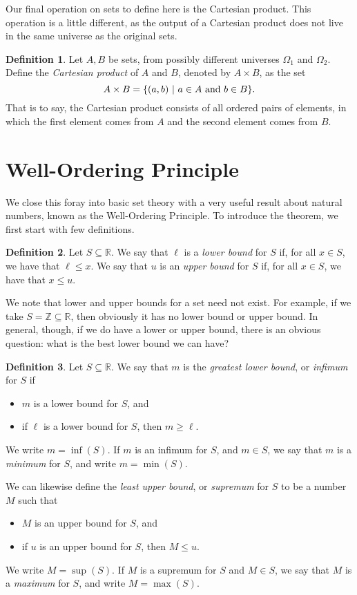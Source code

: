 \documentclass{article}
\theoremstyle{definition}
\newtheorem{definition}{Definition}
\newcommand{\Z}{\mathbb{Z}}
\newcommand{\R}{\mathbb{R}}
\begin{document}
Our final operation on sets to define here is the Cartesian product. This operation is a little different, as the output of a Cartesian product does not live in the same universe as the original sets. 

\begin{definition}
Let $A, B$ be sets, from possibly different universes $\Omega_1$ and $\Omega_2$. Define the {\it Cartesian product} of $A$ and $B$, denoted by $A\times B$, as the set \[A\times B = \{(a, b)\ | \ a\in A\hbox{ and }b\in B\}.\] That is to say, the Cartesian product consists of all ordered pairs of elements, in which the first element comes from $A$ and the second element comes from $B$.
\end{definition}



\section{Well-Ordering Principle}

We close this foray into basic set theory with a very useful result about natural numbers, known as the Well-Ordering Principle. To introduce the theorem, we first start with few definitions.

\begin{definition}
Let $S\subseteq \R$. We say that $\ell$ is a {\it lower bound} for $S$ if, for all $x\in S$, we have that $\ell\leq x$. We say that $u$ is an {\it upper bound} for $S$ if, for all $x\in S$, we have that $x\leq u$.
\end{definition}

We note that lower and upper bounds for a set need not exist. For example, if we take $S=\Z\subseteq \R$, then obviously it has no lower bound or upper bound. In general, though, if we do have a lower or upper bound, there is an obvious question: what is the best lower bound we can have?

\begin{definition}
Let $S\subseteq \R$. We say that $m$ is the {\it greatest lower bound}, or {\it infimum} for $S$ if
\begin{itemize}
\item $m$ is a lower bound for $S$, and 
\item if $\ell$ is a lower bound for $S$, then $m\geq \ell$.
\end{itemize}
We write $m=\inf(S)$. If $m$ is an infimum for $S$, and $m\in S$, we say that $m$ is a {\it minimum} for $S$, and write $m=\min(S)$.

We can likewise define the {\it least upper bound}, or {\it supremum} for $S$ to be a number $M$ such that
\begin{itemize}
\item $M$ is an upper bound for $S$, and
\item if $u$ is an upper bound for $S$, then $M\leq u$. 
\end{itemize} 
We write $M=\sup(S)$. If $M$ is a supremum for $S$ and $M\in S$, we say that $M$ is a {\it maximum} for $S$, and write $M=\max(S)$.
\end{definition}
\end{document}
